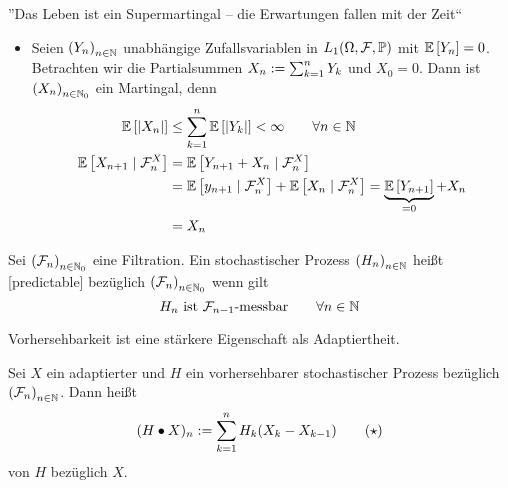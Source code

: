 ''Das Leben ist ein Supermartingal -- die Erwartungen fallen mit der Zeit`` \smiley

\begin{beispiel}
	\begin{itemize}
		\item Seien $\left( Y_n \right)_{n \in \mathbb{N}}$ unabhängige Zufallsvariablen in $L_1(\Omega,\mathcal{F},\mathbb{P})$ mit $\mathbb{E} \left[ Y_n \right] = 0$. Betrachten wir die Partialsummen $X_n \mathrel{:=} \sum_{k=1}^n Y_k$ und $X_0 = 0$. Dann ist $\left( X_n \right)_{n \in \mathbb{N}_0}$ ein Martingal, denn
		\begin{equation*}
			\begin{aligned}
			\mathbb{E} \left[ \left| X_n \right| \right] &\le \sum_{k=1}^n \mathbb{E} \left[ \left| Y_k \right| \right] < \infty \qquad \forall n \in \mathbb{N} \\
			\mathbb{E} \left[ X_{n+1} \mid \mathcal{F}_n^X \right] &= \mathbb{E} \left[ Y_{n+1} + X_n \mid \mathcal{F}_n^X \right] \\
			&= \mathbb{E} \left[ y_{n+1} \mid \mathcal{F}_n^X \right] + \mathbb{E} \left[ X_n \mid \mathcal{F}_n^X \right] = \underbrace{\mathbb{E} \left[ Y_{n+1} \right]}_{=0} + X_n \\
			&= X_n
			\end{aligned}
		\end{equation*}
	\end{itemize}
\end{beispiel}

\begin{*definition}
	Sei $\left( \mathcal{F}_n \right)_{n \in \mathbb{N}_0}$ eine Filtration. Ein stochastischer Prozess $\left( H_n \right)_{n \in \mathbb{N}}$ heißt  [predictable] bezüglich $\left( \mathcal{F}_n \right)_{n \in \mathbb{N}_0}$ wenn gilt
	\begin{equation*}
		H_n \text{ ist } \mathcal{F}_{n-1} \text{-messbar} \qquad \forall n \in \mathbb{N}
	\end{equation*}
\end{*definition}

\begin{*bemerkung}
	Vorhersehbarkeit ist eine stärkere Eigenschaft als Adaptiertheit.
\end{*bemerkung}

\begin{*definition}
	Sei $X$ ein adaptierter und $H$ ein vorhersehbarer stochastischer Prozess bezüglich $\left( \mathcal{F}_n \right)_{n \in \mathbb{N}}$. Dann heißt 
	\begin{equation}
		(H \bullet X)_n \mathrel{:=} \sum_{k=1}^n H_k (X_k - X_{k-1}) \tag{$\star$} \label{eq: diskretesIntegral}
	\end{equation}
	 von $H$ bezüglich $X$.
\end{*definition}

